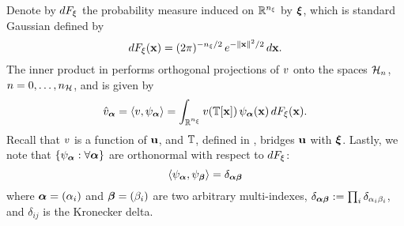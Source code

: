 Denote by $\d\distribution_\z$ the probability measure induced on $\real^\nvars$ by $\vz$, which is standard Gaussian defined by
\begin{equation} \xelab{standard-gaussian-measure}
  \d\distribution_\z(\point) = (2 \pi)^{-\nvars/2} \, e^{-\norm{\point}^2 / 2} \, \d\point.
\end{equation}
The inner product in  performs orthogonal projections of $\w$ onto the spaces $\chaosSpace_n$, $n = 0, \dots, \ncorder$, and is given by
\begin{equation} \xelab{orthogonal-projection}
  \coefficient{\w}_{\multiindex} = \innerProduct{\w, \polynomial_{\multiindex}} = \int_{\real^{\nvars}} \w(\transformation[\point]) \, \polynomial_{\multiindex}(\point) \, \d\distribution_\z(\point).
\end{equation}
Recall that $\w$ is a function of $\vu$, and $\transformation$, defined in , bridges $\vu$ with $\vz$.
Lastly, we note that $\{ \polynomial_{\multiindex}: \forall \multiindex \}$ are orthonormal with respect to $\d\distribution_\z$:
\[
  \innerProduct{\polynomial_{\multiindex}, \polynomial_{\multiindex[\beta]}} = \delta_{\multiindex \multiindex[\beta]}
\]
where $\multiindex = (\alpha_i)$ and $\multiindex[\beta] = (\beta_i)$ are two arbitrary multi-indexes, $\delta_{\multiindex \multiindex[\beta]} := \prod_i \delta_{\alpha_i \beta_i}$, and $\delta_{ij}$ is the Kronecker delta.
